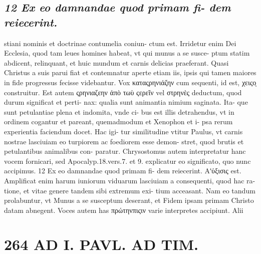 \documentclass{article}
\begin{document}
\begin{pages}
\subsection*{\textit{12 Ex eo damnandae quod primam fi- dem reiecerint.}}stiani nominis et doctrinae contumelia coniun- ctum est. Irridetur enim Dei Ecclesia, quod tam leues homines habeat, vt qui munus a se susce- ptum statim abdicent, relinquant, et huic mundum et carnis delicias praeferant. Quasi Christus a suis parui fiat et contemnatur aperte etiam iis, ipsis qui tamen maiores in fide progressus fecisse videbantur. Vox καταςρηνιάζην cum sequenti, id est, χειςοͅ construitur. Est autem ςρηνιαζεην ἀπὸ τωὺ ςερεῖν vel στρηνὲς deductum, quod durum significat et perti- nax: qualia sunt animantia nimium saginata. Ita- que sunt petulantiae plena et indomita, vnde ci- bus est illis detrahendus, vt in ordinem cogantur et pareant, quemadmodum et Xenophon et i- psa rerum experientia faciendum docet. Hac igi- tur similitudine vtitur Paulus, vt carnis nostrae lasciuiam eo turpiorem ac foediorem esse demon- stret, quod brutis et petulantibus animalibus con- paratur. Chrysostomus autem interpretatur hanc vocem fornicari, sed Apocalyp.18.vers.7. et 9. explicatur eo significato, quo nunc accipimus. 12 Ex eo damnandae quod primam fi- dem reiecerint. Αʹὐξισις est. Amplificat enim harum iuniorum viduarum lasciuiam a consequenti, quod hac ra- tione, et vitae genere tandem sibi extremum exi- tium acceasant. Nam eo tandum prolabuntur, vt Munus a se susceptum deserant, et Fidem ipsam primam Christo datam abnegent. Voces autem has πρώτηνπιςιν varie interpretes accipiunt. Alii  \pend
\section*{264 AD I. PAVL. AD TIM. }\pstart {}
{}

\end{pages}
\end{document}

